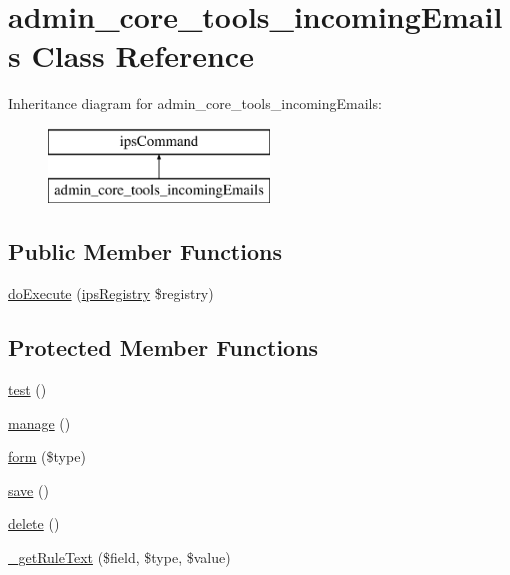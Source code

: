 \hypertarget{classadmin__core__tools__incoming_emails}{\section{admin\-\_\-core\-\_\-tools\-\_\-incoming\-Emails Class Reference}
\label{classadmin__core__tools__incoming_emails}
}
Inheritance diagram for admin\-\_\-core\-\_\-tools\-\_\-incoming\-Emails\-:\begin{figure}[H]
\begin{center}
\leavevmode
\includegraphics[height=2.000000cm]{classadmin__core__tools__incoming_emails}
\end{center}
\end{figure}
\subsection*{Public Member Functions}
\begin{DoxyCompactItemize}
\item 
\hyperlink{classadmin__core__tools__incoming_emails_afbc4e912a0604b94d47d66744c64d8ba}{do\-Execute} (\hyperlink{classips_registry}{ips\-Registry} \$registry)
\end{DoxyCompactItemize}
\subsection*{Protected Member Functions}
\begin{DoxyCompactItemize}
\item 
\hyperlink{classadmin__core__tools__incoming_emails_ad69dd4607977cae05ebe19d1ae604fb1}{test} ()
\item 
\hyperlink{classadmin__core__tools__incoming_emails_ad960fc122349e70360e1c0b72813f6f1}{manage} ()
\item 
\hyperlink{classadmin__core__tools__incoming_emails_ab2262b7446f764635a0da3325ae41aff}{form} (\$type)
\item 
\hyperlink{classadmin__core__tools__incoming_emails_afc8a3c62679cf00ade9f15fb2a6d6132}{save} ()
\item 
\hyperlink{classadmin__core__tools__incoming_emails_a13bdffdd926f26b825ea57066334ff01}{delete} ()
\item 
\hyperlink{classadmin__core__tools__incoming_emails_aed5aa3f8a152ff72877a7d4a91065bfd}{\-\_\-get\-Rule\-Text} (\$field, \$type, \$value)
\end{DoxyCompactItemize}
